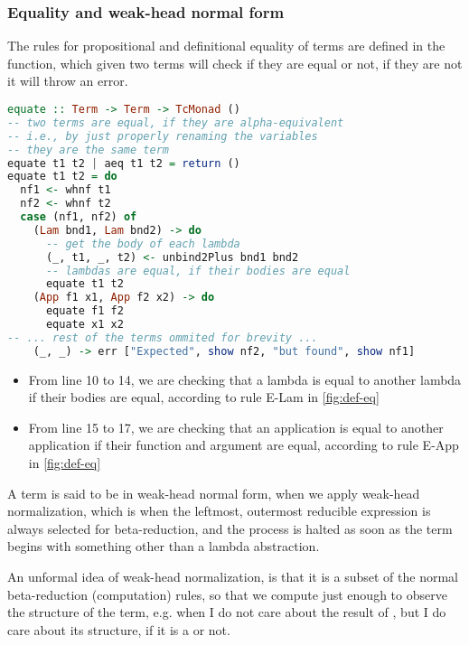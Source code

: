 \subsubsection{Equality and weak-head normal form}

The rules for propositional and definitional equality of terms are defined in the  function, which given two terms will check if they are equal or not, if they are not it will throw an error.

\begin{lstlisting}[language=Haskell]
equate :: Term -> Term -> TcMonad ()
-- two terms are equal, if they are alpha-equivalent
-- i.e., by just properly renaming the variables
-- they are the same term
equate t1 t2 | aeq t1 t2 = return ()
equate t1 t2 = do
  nf1 <- whnf t1
  nf2 <- whnf t2
  case (nf1, nf2) of
    (Lam bnd1, Lam bnd2) -> do
      -- get the body of each lambda
      (_, t1, _, t2) <- unbind2Plus bnd1 bnd2
      -- lambdas are equal, if their bodies are equal
      equate t1 t2
    (App f1 x1, App f2 x2) -> do
      equate f1 f2
      equate x1 x2
-- ... rest of the terms ommited for brevity ...
    (_, _) -> err ["Expected", show nf2, "but found", show nf1]
\end{lstlisting}

\begin{itemize}
       \item From line 10 to 14, we are checking that a lambda is equal to another lambda if their bodies are equal, according to rule E-Lam in \autoref{fig:def-eq}
       \item From line 15 to 17, we are checking that an application is equal to another application if their function and argument are equal, according to rule E-App in \autoref{fig:def-eq}
\end{itemize}

\begin{definition}
       A term is said to be in weak-head normal form, when we apply weak-head normalization, which is when the leftmost, outermost reducible expression is always selected for beta-reduction, and the process is halted as soon as the term begins with something other than a lambda abstraction.~\cite{advancedtapl}

       An unformal idea of weak-head normalization, is that it is a subset of the normal beta-reduction (computation) rules, so that we compute just enough to observe the structure of the term, e.g. when I do not care about the result of , but I do care about its structure, if it is a  or not.
\end{definition}

